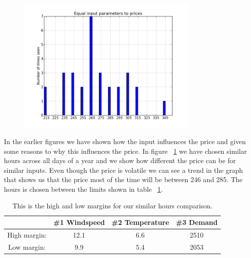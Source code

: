 \begin{figure}[H]
\centering
\includegraphics[width=0.8\textwidth ,natwidth=410,natheight=237]{billeder/energy_price_plots/same_hour_distribution.png}
\caption{}
\label{fig:same_hour_distribution}
\end{figure}

In the earlier figures we have shown how the input influences the price and given some reasons to why this influences the price. In figure ~\ref{fig:same_hour_distribution} we have chosen similar hours across all days of a year and we show how different the price can be for similar inputs. Even though the price is volatile we can see a trend in the graph that shows us that the price most of the time will be between 246 and 285. The hours is chosen between the limits shown in table ~\ref{table:similarHoursLimits}.

\begin{table}[H]
\centering  %
\begin{tabular}{c c c c} %
 & \#1 Windspeed & \#2 Temperature & \#3 Demand \\ [0.5ex] %
\hline                  %
High margin: & 12.1 & 6.6 & 2510  \\
Low margin: & 9.9 & 5.4 & 2053 \\ [1ex] %
\hline %
\end{tabular}
\caption{This is the high and low margins for our similar hours comparison.} %
\label{table:similarHoursLimits} %
\end{table}


